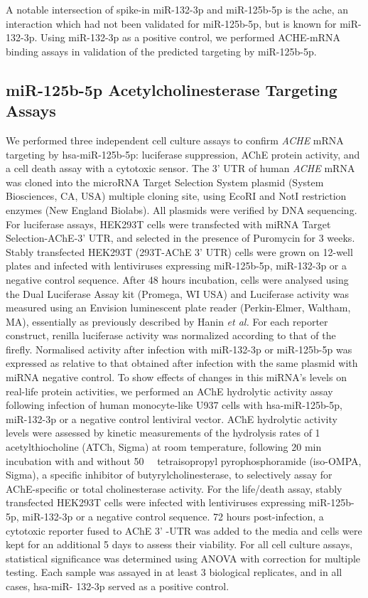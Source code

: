 A notable intersection of spike-in miR-132-3p and miR-125b-5p is the \ac{ache}, an interaction which had not been validated for miR-125b-5p, but is known for miR-132-3p.\cite{Shaked2009, Shaltiel2013} Using miR-132-3p as a positive control, we performed ACHE-mRNA binding assays in validation of the predicted targeting by miR-125b-5p.

\begin{method}

\subsection{miR-125b-5p Acetylcholinesterase Targeting Assays}
We performed three independent cell culture assays to confirm \emph{ACHE} mRNA targeting by hsa-miR-125b-5p: luciferase suppression, AChE protein activity, and a cell death assay with a cytotoxic sensor. The 3' UTR of human \emph{ACHE} mRNA\cite{Soreq1990} was cloned into the microRNA Target Selection System plasmid (System Biosciences, CA, USA) multiple cloning site, using EcoRI and NotI restriction enzymes (New England Biolabs). All plasmids were verified by DNA sequencing. For luciferase assays, HEK293T cells were transfected with miRNA Target Selection-AChE-3' UTR, and selected in the presence of Puromycin for 3 weeks. Stably transfected HEK293T (293T-AChE 3' UTR) cells were grown on 12-well plates and infected with lentiviruses expressing miR-125b-5p, miR-132-3p or a negative control sequence. After 48 hours incubation, cells were analysed using the Dual Luciferase Assay kit (Promega, WI USA) and Luciferase activity was measured using an Envision luminescent plate reader (Perkin-Elmer, Waltham, MA), essentially as previously described by Hanin \emph{et al.}\cite{Hanin2014} For each reporter construct, renilla luciferase activity was normalized according to that of the firefly. Normalised activity after infection with miR-132-3p or miR-125b-5p was expressed as relative to that obtained after infection with the same plasmid with miRNA negative control. To show effects of changes in this miRNA’s levels on real-life protein activities, we performed an AChE hydrolytic activity assay following infection of human monocyte-like U937 cells with hsa-miR-125b-5p, miR-132-3p or a negative control lentiviral vector. AChE hydrolytic activity levels were assessed by kinetic measurements of the hydrolysis rates of \SI{1}{\milli\Molar} acetylthiocholine (ATCh, Sigma) at room temperature, following 20 min incubation with and without \SI{50}{\micro\Molar} tetraisopropyl pyrophosphoramide (iso-OMPA, Sigma), a specific inhibitor of butyrylcholinesterase, to selectively assay for AChE-specific or total cholinesterase activity. For the life/death assay, stably transfected HEK293T cells were infected with lentiviruses expressing miR-125b-5p, miR-132-3p or a negative control sequence. 72 hours post-infection, a cytotoxic reporter fused to AChE 3' -UTR was added to the media and cells were kept for an additional 5 days to assess their viability. For all cell culture assays, statistical significance was determined using ANOVA with correction for multiple testing. Each sample was assayed in at least 3 biological replicates, and in all cases, hsa-miR- 132-3p served as a positive control.


\end{method}
